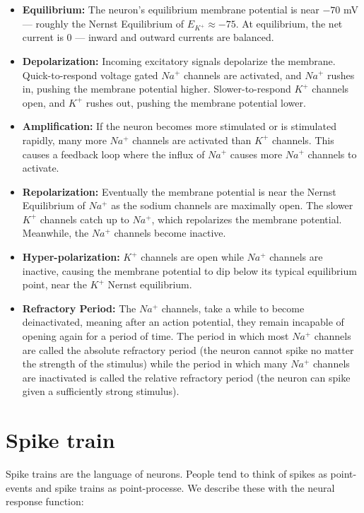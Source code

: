 \documentclass[12pt,a4paper]{report}
\begin{document}
\begin{itemize}
    \item \textbf{Equilibrium:} The neuron’s equilibrium membrane potential is near \(-70\) mV — roughly the Nernst Equilibrium of \( E_{K^+} \approx -75 \). At equilibrium, the net current is \(0\) — inward and outward currents are balanced.
    \item \textbf{Depolarization:} Incoming excitatory signals depolarize the membrane. Quick-to-respond voltage gated \( Na^+ \) channels are activated, and \( Na^+ \) rushes in, pushing the membrane potential higher. Slower-to-respond \( K^+ \) channels open, and \( K^+ \) rushes out, pushing the membrane potential lower.
    \item \textbf{Amplification:} If the neuron becomes more stimulated or is stimulated rapidly, many more \( Na^+ \) channels are activated than \( K^+ \) channels. This causes a feedback loop where the influx of \( Na^+ \) causes more \( Na^+ \) channels to activate.
    \item \textbf{Repolarization:} Eventually the membrane potential is near the Nernst Equilibrium of \( Na^+ \) as the sodium channels are maximally open. The slower \( K^+ \) channels catch up to \( Na^+ \), which repolarizes the membrane potential. Meanwhile, the \( Na^+ \) channels become inactive.
    \item \textbf{Hyper-polarization:} \( K^+ \) channels are open while \( Na^+ \) channels are inactive, causing the membrane potential to dip below its typical equilibrium point, near the \( K^+ \) Nernst equilibrium.
    \item \textbf{Refractory Period:} The \( Na^+ \) channels, take a while to become deinactivated, meaning after an action potential, they remain incapable of opening again for a period of time. The period in which most \( Na^+ \) channels are called the absolute refractory period (the neuron cannot spike no matter the strength of the stimulus) while the period in which many \( Na^+ \) channels are inactivated is called the relative refractory period (the neuron can spike given a sufficiently strong stimulus).
\end{itemize}



\section{Spike train}

Spike trains are the language of neurons. People tend to think of spikes as point-events and spike trains as point-processe. We describe these with the neural response function:
\end{document}
